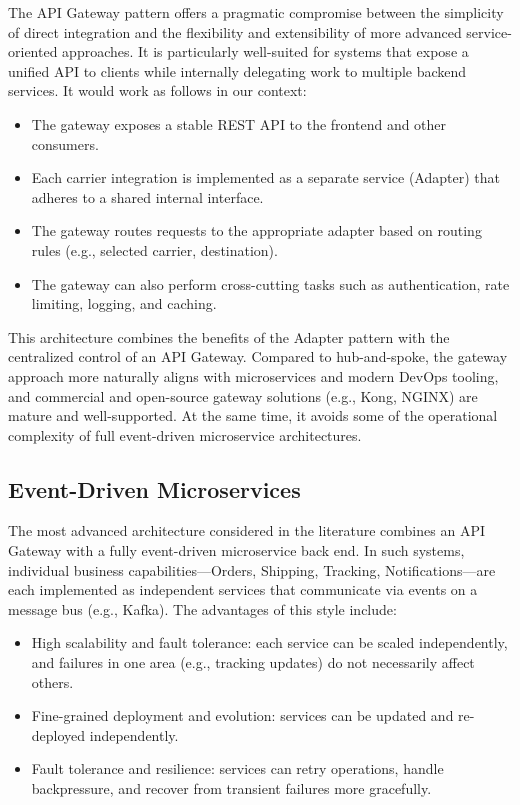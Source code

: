 \documentclass{imc-inf}
\begin{document}
The API Gateway pattern offers a pragmatic compromise between the simplicity of direct integration and the flexibility and extensibility of more advanced service-oriented approaches.
It is particularly well-suited for systems that expose a unified API to clients while internally delegating work to multiple backend services.
It would work as follows in our context:

\begin{itemize}[itemsep=3pt]
  \item The gateway exposes a stable REST API to the frontend and other consumers.
  \item Each carrier integration is implemented as a separate service (Adapter) that adheres to a shared internal interface.
  \item The gateway routes requests to the appropriate adapter based on routing rules (e.g., selected carrier, destination).
  \item The gateway can also perform cross-cutting tasks such as authentication, rate limiting, logging, and caching.
\end{itemize}

This architecture combines the benefits of the Adapter pattern with the centralized control of an API Gateway.
Compared to hub-and-spoke, the gateway approach more naturally aligns with microservices and modern DevOps tooling, and commercial and open-source gateway solutions (e.g., Kong, NGINX) are mature and well-supported.
At the same time, it avoids some of the operational complexity of full event-driven microservice architectures.

\subsection{Event-Driven Microservices}

The most advanced architecture considered in the literature combines an API Gateway with a fully event-driven microservice back end. In such systems, individual business capabilities—Orders, Shipping, Tracking, Notifications—are each implemented as independent services that communicate via events on a message bus (e.g., Kafka).
The advantages of this style include:

\begin{itemize}[itemsep=3pt]
  \item High scalability and fault tolerance: each service can be scaled independently, and failures in one area (e.g., tracking updates) do not necessarily affect others.
  \item Fine-grained deployment and evolution: services can be updated and re-deployed independently.
  \item Fault tolerance and resilience: services can retry operations, handle backpressure, and recover from transient failures more gracefully.
\end{itemize}
\end{document}
